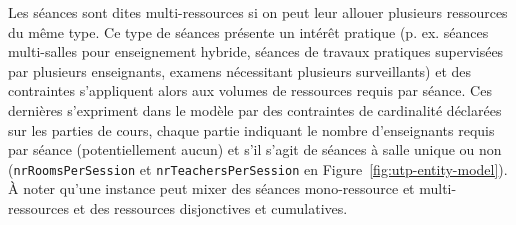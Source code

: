 Les séances sont dites multi-ressources si on peut leur allouer plusieurs ressources du même type.
%
Ce type de séances présente un intérêt pratique (p. ex. séances multi-salles pour enseignement hybride, 
séances de travaux pratiques supervisées par plusieurs enseignants, 
examens nécessitant plusieurs surveillants)
et des contraintes s'appliquent alors aux volumes de ressources requis par séance.
Ces dernières s'expriment dans le modèle par des contraintes de cardinalité déclarées sur les parties de cours, chaque partie indiquant le nombre d'enseignants requis par séance (potentiellement aucun) et s'il s'agit de séances à salle unique ou non (\texttt{nrRoomsPerSession} et \texttt{nrTeachersPerSession} en Figure~\ref{fig:utp-entity-model}).
À noter qu'une instance peut mixer des séances
mono-ressource %
et multi-ressources
et des ressources disjonctives et cumulatives.

